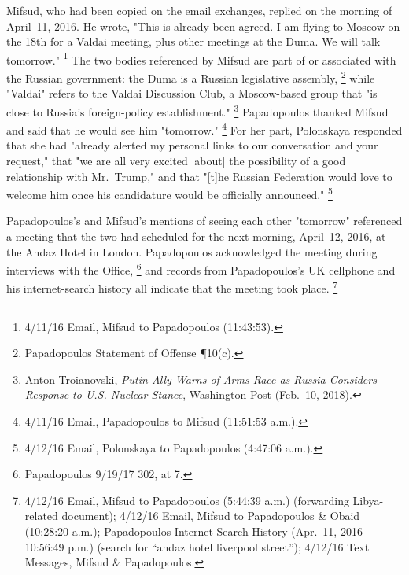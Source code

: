 Mifsud, who had been copied on the email exchanges, replied on the morning of April~11, 2016.
He wrote, "This is already been agreed.
I am flying to Moscow on the 18th for a Valdai meeting, plus other meetings at the Duma.
We will talk tomorrow."%
\footnote{4/11/16 Email, Mifsud to Papadopoulos (11:43:53).}
The two bodies referenced by Mifsud are part of or associated with the Russian government: the Duma is a Russian legislative assembly,%
\footnote{Papadopoulos Statement of Offense \P 10(c).}
while "Valdai" refers to the Valdai Discussion Club, a Moscow-based group that "is close to Russia's foreign-policy establishment."%
\footnote{Anton Troianovski, \textit{Putin Ally Warns of Arms Race as Russia Considers Response to U.S. Nuclear Stance}, Washington Post (Feb.~10, 2018).}
Papadopoulos thanked Mifsud and said that he would see him "tomorrow."%
\footnote{4/11/16 Email, Papadopoulos to Mifsud (11:51:53 a.m.).}
For her part, Polonskaya responded that she had "already alerted my personal links to our conversation and your request," that "we are all very excited [about] the possibility of a good relationship with Mr.~Trump," and that "[t]he Russian Federation would love to welcome him once his candidature would be officially announced."%
\footnote{4/12/16 Email, Polonskaya to Papadopoulos (4:47:06 a.m.).}

Papadopoulos's and Mifsud's mentions of seeing each other "tomorrow" referenced a meeting that the two had scheduled for the next morning, April~12, 2016, at the Andaz Hotel in London.
Papadopoulos acknowledged the meeting during interviews with the Office,%
\footnote{Papadopoulos 9/19/17 302, at 7.}
and records from Papadopoulos's UK cellphone and his internet-search history all indicate that the meeting took place.%
\footnote{4/12/16 Email, Mifsud to Papadopoulos (5:44:39 a.m.) (forwarding Libya-related document); 4/12/16 Email, Mifsud to Papadopoulos \& Obaid (10:28:20 a.m.); Papadopoulos Internet Search History (Apr.~11, 2016 10:56:49 p.m.) (search for “andaz hotel liverpool street”); 4/12/16 Text Messages, Mifsud \& Papadopoulos.}

